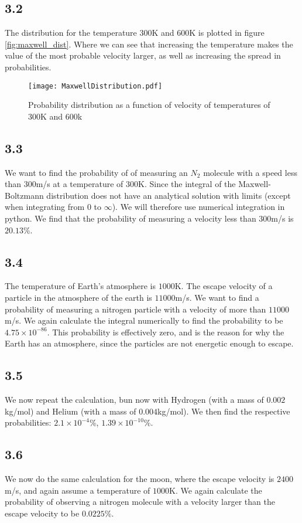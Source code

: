\documentclass[a4paper,10pt, english]{article}
\begin{document}
\subsection*{3.2}
The distribution for the temperature $300$K and $600$K is plotted in figure \vref{fig:maxwell_dist}. Where we can see that increasing the temperature makes the value of the most probable velocity larger, as well as increasing the spread in probabilities.
\begin{figure}[h!]
  \centering
    \texttt{[image: MaxwellDistribution.pdf]}
    \caption{Probability distribution as a function of velocity of temperatures of $300$K and $600$k}
    \label{fig:maxwell_dist}
\end{figure}

\subsection*{3.3}
We want to find the probability of of measuring an $N_2$ molecule with a speed less than $300$m/s at a temperature of $300$K. Since the integral of the Maxwell-Boltzmann distribution does not have an analytical solution with limits (except when integrating from $0$ to $\infty$). We will therefore use numerical integration in python. We find that the probability of measuring a velocity less than $300$m/s is $20.13$\%.

\subsection*{3.4}
The temperature of Earth's atmosphere is $1000$K. The escape velocity of a particle in the atmosphere of the earth is $11 000$m/s. We want to find a probability of measuring a nitrogen particle with a velocity of more than $11000$m/s. We again calculate the integral numerically to find the probability to be $4.75\times 10^{-86}$. This probability is effectively zero, and is the reason for why the Earth has an atmosphere, since the particles are not energetic enough to escape.

\subsection*{3.5}
We now repeat the calculation, bun now with Hydrogen (with a mass of $0.002$kg/mol) and Helium (with a mass of $0.004$kg/mol). We then find the respective probabilities: $2.1\times 10^{-4}$\%, $1.39\times 10^{-10}$\%.

\subsection*{3.6}
We now do the same calculation for the moon, where the escape velocity is $2400$m/s, and again assume a temperature of $1000$K. We again calculate the probability of observing a nitrogen molecule with a velocity larger than the escape velocity to be  $0.0225$\%.
\end{document}
